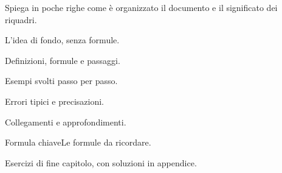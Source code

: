 Spiega in poche righe come è organizzato il documento e il significato dei riquadri.
\begin{intuizione}L'idea di fondo, senza formule.\end{intuizione}
\begin{tecnica}Definizioni, formule e passaggi.\end{tecnica}
\begin{esempio}Esempi svolti passo per passo.\end{esempio}
\begin{attenzione}Errori tipici e precisazioni.\end{attenzione}
\begin{mlbox}Collegamenti e approfondimenti.\end{mlbox}
\begin{formulat}{Formula chiave}Le formule da ricordare.\end{formulat}
\begin{esercizi}Esercizi di fine capitolo, con soluzioni in appendice.\end{esercizi}
\clearpage\thispagestyle{plain}
\tableofcontents
